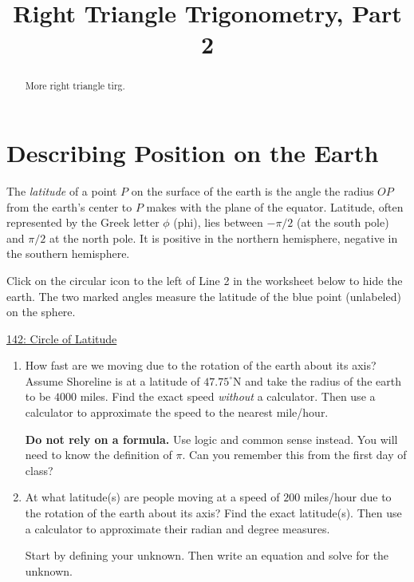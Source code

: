 \documentclass{ximera}
\title{Right Triangle Trigonometry, Part 2}
\begin{document}
\begin{abstract}
More right triangle tirg.
\end{abstract}
\maketitle


\section{Describing Position on the Earth}

The \emph{latitude} of a point $P$ on the surface of the earth is the angle the radius $OP$ from the earth's center to $P$ makes with the plane of the equator. Latitude, often represented by the Greek letter $\phi$ (phi), lies between $-\pi/2$ (at the south pole) and $\pi/2$ at the north pole. It is positive in the northern hemisphere, negative in the southern hemisphere.

Click on the circular icon to the left of Line 2 in the worksheet below to hide the earth. The two marked angles measure the latitude of the blue point (unlabeled) on the sphere.

\begin{onlineOnly}
    \begin{center}
\end{center}
\end{onlineOnly}

\href{https://www.desmos.com/3d/pio4iubhvt}{142: Circle of Latitude}


\begin{question} \label{Qfksadfsdt4e4}
\begin{enumerate}
\item How fast are we moving due to the rotation of the earth about its axis? Assume Shoreline is at a latitude of $47.75^\circ$N and take the radius of the earth to be $4000$ miles. Find the exact speed \emph{without} a calculator. Then use a calculator to approximate the speed to the nearest mile/hour.

{\bf Do not rely on a formula.} Use logic and common sense instead. You will need to know the definition of $\pi$. Can you remember this from the first day of class?

\item At what latitude(s) are people moving at a speed of $200$ miles/hour due to the rotation of the earth about its axis? Find the exact latitude(s). Then use a calculator to approximate their radian and degree measures.

Start by defining your unknown. Then write an equation and solve for the unknown.
\end{enumerate}
\end{question}
\end{document}
